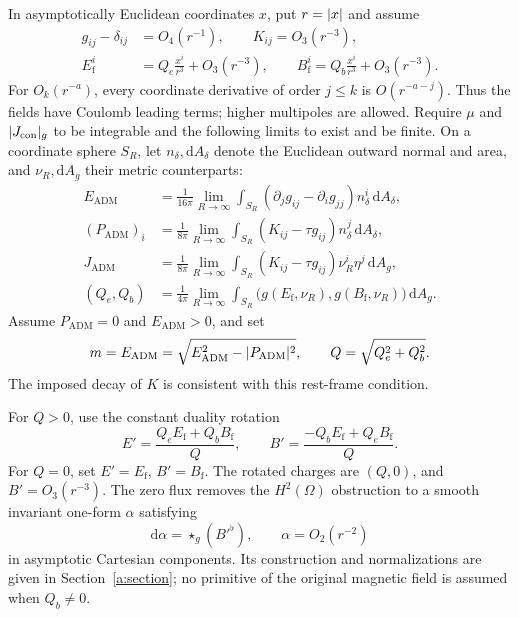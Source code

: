 \documentclass[11pt]{article}
\numberwithin{equation}{section}
\theoremstyle{definition}
\theoremstyle{remark}
\newcommand{\dd}{\mathrm d}
\DeclarePairedDelimiter{\abs}{\lvert}{\rvert}
\begin{document}
In asymptotically Euclidean coordinates \(x\), put \(r=\abs{x}\) and assume
\begin{equation}\label{m:asymptotics}
 \begin{split}
 g_{ij}-\delta_{ij}&=O_4(r^{-1}),\qquad K_{ij}=O_3(r^{-3}),\\
 E_{\mathrm f}^i&=Q_e\frac{x^i}{r^3}+O_3(r^{-3}),\qquad
 B_{\mathrm f}^i=Q_b\frac{x^i}{r^3}+O_3(r^{-3}).
 \end{split}
\end{equation}
For \(O_k(r^{-a})\), every coordinate derivative of order \(j\le k\) is
\(O(r^{-a-j})\). Thus the fields have Coulomb leading terms; higher
multipoles are allowed. Require \(\mu\) and \(\abs{J_{\mathrm{con}}}_g\)
to be integrable and the following limits to exist and be finite. On a
coordinate sphere \(S_R\), let \(n_\delta,\dd A_\delta\) denote the Euclidean
outward normal and area, and \(\nu_R,\dd A_g\) their metric counterparts:
\begin{align}
 E_{\mathrm{ADM}}&=\frac1{16\pi}\lim_{R\to\infty}
  \int_{S_R}(\partial_jg_{ij}-\partial_ig_{jj})n_\delta^i\,\dd A_\delta,
  \label{m:energy}\\
 (P_{\mathrm{ADM}})_i&=\frac1{8\pi}\lim_{R\to\infty}
  \int_{S_R}(K_{ij}-\tau g_{ij})n_\delta^j\,\dd A_\delta,
  \label{m:momentum}\\
 J_{\mathrm{ADM}}&=\frac1{8\pi}\lim_{R\to\infty}
  \int_{S_R}(K_{ij}-\tau g_{ij})\nu_R^i\eta^j\,\dd A_g,
  \label{m:angular-adm}\\
 (Q_e,Q_b)&=\frac1{4\pi}\lim_{R\to\infty}
  \int_{S_R}\bigl(g(E_{\mathrm f},\nu_R),g(B_{\mathrm f},\nu_R)\bigr)\,\dd A_g.
  \label{m:charges}
\end{align}
Assume \(P_{\mathrm{ADM}}=0\) and \(E_{\mathrm{ADM}}>0\), and set
\begin{equation}\label{m:mass-charge}
 m=E_{\mathrm{ADM}}=\sqrt{E_{\mathrm{ADM}}^2-\abs{P_{\mathrm{ADM}}}^2},
 \qquad Q=\sqrt{Q_e^2+Q_b^2}.
\end{equation}
The imposed decay of \(K\) is consistent with this rest-frame condition.

For \(Q>0\), use the constant duality rotation
\begin{equation}\label{m:duality}
 E'=\frac{Q_eE_{\mathrm f}+Q_bB_{\mathrm f}}Q,\qquad
 B'=\frac{-Q_bE_{\mathrm f}+Q_eB_{\mathrm f}}Q.
\end{equation}
For \(Q=0\), set \(E'=E_{\mathrm f}\), \(B'=B_{\mathrm f}\).
The rotated charges are \((Q,0)\), and \(B'=O_3(r^{-3})\). The zero flux
removes the \(H^2(\Omega)\) obstruction to a smooth invariant one-form
\(\alpha\) satisfying
\begin{equation}\label{m:magnetic-primitive}
 \dd\alpha=\star_g(B'^\flat),\qquad \alpha=O_2(r^{-2})
\end{equation}
in asymptotic Cartesian components. Its construction and normalizations are
given in Section~\ref{a:section}; no primitive of the original magnetic field
is assumed when \(Q_b\ne0\).
\end{document}
